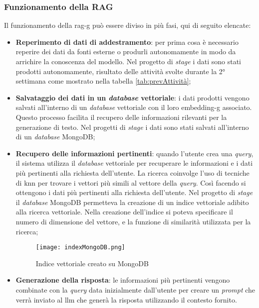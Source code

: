 \subsubsection{Funzionamento della RAG}
Il funzionamento della \gls{rag-g} può essere diviso in più fasi, qui di seguito elencate:
\begin{itemize}
    \item \textbf{Reperimento di dati di addestramento}: per prima cosa è necessario reperire dei dati da fonti esterne o produrli autonomamente in modo da arrichire la conoscenza del modello. Nel progetto di \textit{stage} i dati sono stati prodotti autonomamente, risultato delle attività svolte durante la 2° settimana come mostrato nella tabella \ref{tab:prevAttività};
    \item \textbf{Salvataggio dei dati in un \textit{database} vettoriale}: i dati prodotti vengono salvati all'interno di un \textit{database} vettoriale con il loro \gls{embedding-g} associato. Questo processo facilita il recupero delle informazioni rilevanti per la generazione di testo. Nel progetti di \textit{stage} i dati sono stati salvati all'interno di un \textit{database} MongoDB;
    \item \textbf{Recupero delle informazioni pertinenti}: quando l'utente crea una \textit{query}, il sistema utilizza il \textit{database} vettoriale per recuperare le informazioni e i dati più pertinenti alla richiesta dell'utente. La ricerca coinvolge l'uso di tecniche di \gls{knn} per trovare i vettori più simili al vettore della \textit{query}. Così facendo si ottengono i dati più pertinenti alla richiesta dell'utente. Nel progetto di \textit{stage} il \textit{database} MongoDB permetteva la creazione di un indice vettoriale adibito alla ricerca vettoriale. Nella creazione dell'indice si poteva specificare il numero di dimensione del vettore, e la funzione di similarità utilizzata per la ricerca;
    \begin{figure}[H]
        \centering  
        \texttt{[image: indexMongoDB.png]}
        \caption{Indice vettoriale creato su MongoDB}
        \label{fig:indexMongoDB}
    \end{figure}
    \item \textbf{Generazione della risposta}: le informazioni più pertinenti vengono combinate con la \textit{query} data inizialmente dall'utente per creare un \textit{prompt} che verrà inviato al \gls{llm} che generà la risposta utilizzando il contesto fornito.
\end{itemize}

